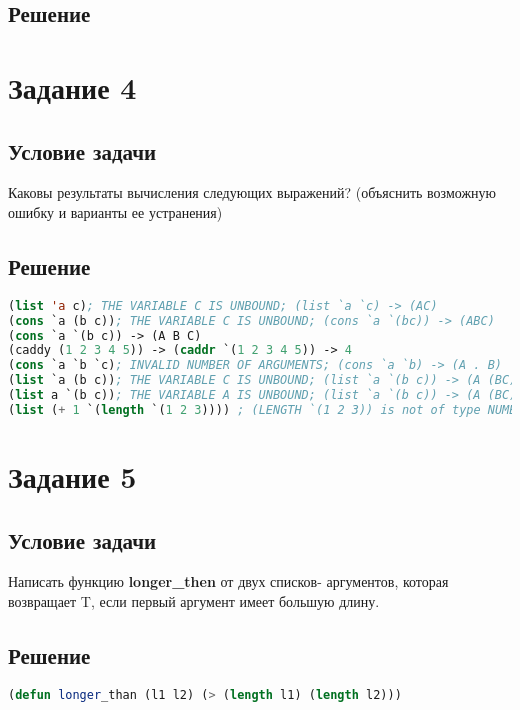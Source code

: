 \subsection*{Решение}


\section*{Задание 4}
\subsection*{Условие задачи}
Каковы результаты вычисления следующих выражений? (объяснить возможную ошибку и
варианты ее устранения)

\subsection*{Решение}

\begin{lstlisting}[label=4xd,caption=Решение задания №4, language=lisp]
(list 'a c); THE VARIABLE C IS UNBOUND; (list `a `c) -> (AC)
(cons `a (b c)); THE VARIABLE C IS UNBOUND; (cons `a `(bc)) -> (ABC)
(cons `a `(b c)) -> (A B C)
(caddy (1 2 3 4 5)) -> (caddr `(1 2 3 4 5)) -> 4
(cons `a `b `c); INVALID NUMBER OF ARGUMENTS; (cons `a `b) -> (A . B)
(list `a (b c)); THE VARIABLE C IS UNBOUND; (list `a `(b c)) -> (A (BC))
(list a `(b c)); THE VARIABLE A IS UNBOUND; (list `a `(b c)) -> (A (BC))
(list (+ 1 `(length `(1 2 3)))) ; (LENGTH `(1 2 3)) is not of type NUMBER; (list (+1 (length `(123)))) -> 4
\end{lstlisting}

\section*{Задание 5}
\subsection*{Условие задачи}
Написать функцию \textbf{longer\_then} от двух списков- аргументов, которая возвращает T, если первый аргумент имеет большую длину.

\subsection*{Решение}

\begin{lstlisting}[label=5xd,caption=Решение задания №5, language=lisp]
(defun longer_than (l1 l2) (> (length l1) (length l2)))
\end{lstlisting}


